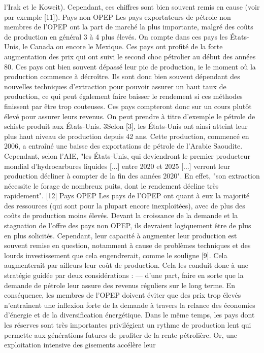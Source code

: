 l’Irak et le Koweit). Cependant, ces chiffres sont bien souvent remis en cause (voir par exemple
[11]).
Pays non OPEP Les pays exportateurs de pétrole non membres de l’OPEP ont la part de
marché la plus importante, malgré des coûts de production en général 3 à 4 plus élevés. On compte
dans ces pays les États-Unis, le Canada ou encore le Mexique. Ces pays ont profité de la forte
augmentation des prix qui ont suivi le second choc pétrolier au début des années 80.
Ces pays ont bien souvent dépassé leur pic de production, ie le moment où la production commence
à décroître. Ils sont donc bien souvent dépendant des nouvelles techniques d’extraction pour pouvoir
assurer un haut taux de production, ce qui peut également faire baisser le rendement si ces méthodes
finissent par être trop couteuses. Ces pays compteront donc sur un cours plutôt élevé pour assurer
leurs revenus. On peut prendre à titre d’exemple le pétrole de schiste produit aux États-Unis.
3Selon [3], les États-Unis ont ainsi atteint leur plus haut niveau de production depuis 42 ans. Cette
production, commencé en 2006, a entraîné une baisse des exportations de pétrole de l’Arabie
Saoudite. Cependant, selon l’AIE, "les États-Unis, qui deviendront le premier producteur mondial
d’hydrocarbures liquides [...] entre 2020 et 2025 [...] verront leur production décliner à compter de
la fin des années 2020". En effet, "son extraction nécessite le forage de nombreux puits, dont le
rendement décline très rapidement". [12]
Pays OPEP Les pays de l’OPEP ont quant à eux la majorité des ressources (qui sont pour
la plupart encore inexploitées), avec de plus des coûts de production moins élevés. Devant la
croissance de la demande et la stagnation de l’offre des pays non OPEP, ils devraient logiquement
être de plus en plus solicités. Cependant, leur capacité à augmenter leur production est souvent
remise en question, notamment à cause de problèmes techniques et des lourds investissement que
cela engendrerait, comme le souligne [9]. Cela augmenterait par ailleurs leur coût de production.
Cela les conduit donc à une stratégie guidée par deux considérations :
— d’une part, faire en sorte que la demande de pétrole leur assure des revenus réguliers sur le
long terme. En conséquence, les membres de l’OPEP doivent éviter que des prix trop élevés
n’entraînent une inflexion forte de la demande à travers la relance des économies d’énergie
et de la diversification énergétique. Dans le même temps, les pays dont les réserves sont très
importantes privilégient un rythme de production lent qui permette aux générations futures
de profiter de la rente pétrolière. Or, une exploitation intensive des gisements accélère leur
